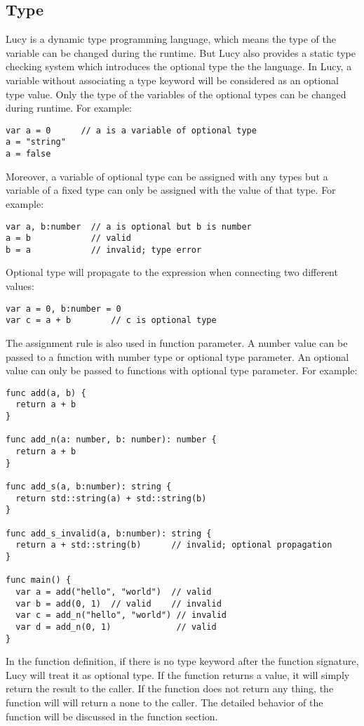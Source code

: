 \subsection{Type}
Lucy is a dynamic type programming language, which means the type of the variable can be changed during the runtime. But Lucy also provides a static type checking system which introduces the optional type the the language. In Lucy, a variable without associating a type keyword will be considered as an optional type value. Only the type of the variables of the optional types can be changed during runtime. For example:
\begin{lstlisting}
var a = 0      // a is a variable of optional type
a = "string"
a = false
\end{lstlisting}
Moreover, a variable of optional type can be assigned with any types but a variable of a fixed type can only be assigned with the value of that type. For example:
\begin{lstlisting}
var a, b:number  // a is optional but b is number
a = b            // valid
b = a            // invalid; type error
\end{lstlisting}
Optional type will propagate to the expression when connecting two different values:
\begin{lstlisting}
var a = 0, b:number = 0
var c = a + b        // c is optional type
\end{lstlisting}
The assignment rule is also used in function parameter. A number value can be passed to a function with number type or optional type parameter. An optional value can only be passed to functions with optional type parameter. For example:
\begin{lstlisting}
func add(a, b) {
  return a + b
}

func add_n(a: number, b: number): number {
  return a + b
}

func add_s(a, b:number): string {
  return std::string(a) + std::string(b)
}

func add_s_invalid(a, b:number): string {
  return a + std::string(b)      // invalid; optional propagation
}

func main() {
  var a = add("hello", "world")  // valid
  var b = add(0, 1)  // valid    // invalid
  var c = add_n("hello", "world") // invalid
  var d = add_n(0, 1)             // valid
}
\end{lstlisting}
In the function definition, if there is no type keyword after the function signature, Lucy will treat it as optional type. If the function returns a value, it will simply return the result to the caller. If the function does not return any thing, the function will will return a none to the caller. The detailed behavior of the function will be discussed in the function section.

